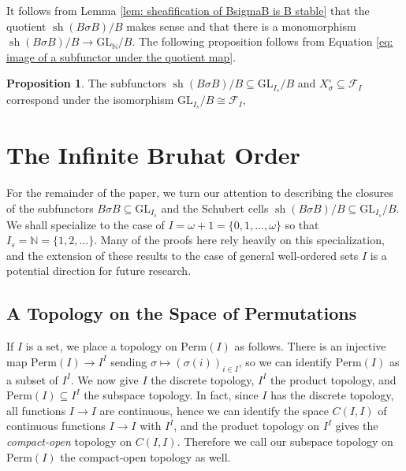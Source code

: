 \documentclass[oneside,11pt]{amsart}
\newcommand{\nn}{\ensuremath{\mathbb{N}}}
\newcommand{\mF}{\ensuremath{\mathcal{F}}}
\newcommand{\GL}{\ensuremath{\text{GL}}}
\newcommand{\Perm}{\ensuremath{\text{Perm}}}
\newcommand{\sh}{\operatorname{sh}}
\theoremstyle{definition}
\newtheorem{proof techniques}{Proof Techniques}
\newtheorem{proposition}{Proposition}
\begin{document}
It follows from Lemma \ref{lem: sheafification of BsigmaB is B stable} that the quotient $\sh(B \sigma B) / B$ makes sense and that there is a monomorphism $\sh(B \sigma B) / B \to \GL_\nn / B$. The following proposition follows from Equation \ref{eq: image of a subfunctor under the quotient map}. 

\begin{proposition}\label{prop: identification of the schubert cells with subfunctors of the quotient}
The subfunctors $\sh(B \sigma B) / B \subseteq \GL_{I_s} / B$ and $X^\circ_\sigma \subseteq \mF_I$ correspond under the isomorphism $\GL_{I_s} / B \cong \mF_I$, 
\end{proposition}


\section{The Infinite Bruhat Order}\label{sec: the infinite bruhat order}


For the remainder of the paper, we turn our attention to describing the closures of the subfunctors $B \sigma B \subseteq \GL_{I_s}$ and the Schubert cells $\sh(B \sigma B) / B \subseteq \GL_{I_s} / B$. We shall specialize to the case of $I = \omega + 1 = \{ 0 , 1 , \ldots, \omega \}$ so that $I_s = \nn = \{ 1 , 2 , \ldots \}$. Many of the proofs here rely heavily on this specialization, and the extension of these results to the case of general well-ordered sets $I$ is a potential direction for future research.  




\subsection{A Topology on the Space of Permutations} 

If $I$ is a set, we place a topology on $\Perm(I)$ as follows. There is an injective map $\Perm(I) \to I^I$ sending $\sigma \mapsto (\sigma(i) )_{i \in I}$, so we can identify $\Perm(I)$ as a subset of $I^I$. We now give $I$ the discrete topology, $I^I$ the product topology, and $\Perm(I) \subseteq I^I$ the subspace topology. In fact, since $I$ has the discrete topology, all functions $I \to I$ are continuous, hence we can identify the space $C(I , I)$ of continuous functions $I \to I$ with $I^I$, and the product topology on $I^I$ gives the \emph{compact-open} topology on $C(I , I)$. Therefore we call our subspace topology on $\Perm(I)$ the compact-open topology as well. 
\end{document}
